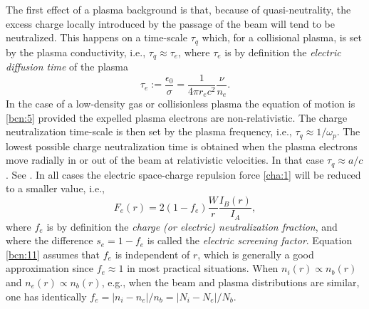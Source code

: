 \documentclass [12pt,a4paper,     ]{report} %
\newcommand{\DEF}{:=}                 %
\begin{document}
	The first effect of a plasma background is that, because of quasi-neutrality, the excess charge locally introduced by the passage of the beam will tend to be neutralized.  This happens on a time-scale $\tau_q$ which, for a collisional plasma, is set by the plasma conductivity, i.e., $\tau_q \approx \tau_e$, where $\tau_e$ is by definition the \emph{electric diffusion time} of the plasma
%
\begin{equation}\label{bcn:10} %
            \tau_e \DEF \frac{\epsilon_0}{\sigma}
                      = \frac{1}{4\pi r_e c^2}\frac{\nu}{n_e}.
\end{equation}
%
In the case of a low-density gas or collisionless plasma the equation of motion is \eqref{bcn:5} provided the expelled plasma electrons are non-relativistic.  The charge neutralization time-scale is then set by the plasma frequency, i.e., $\tau_q \approx 1/\omega_p$.  The lowest possible charge neutralization time is obtained when the plasma electrons move radially in or out of the beam at relativistic velocities.  In that case $\tau_q \approx a/c$. See \cite[p.531]{OLSON1973-}.  In all cases the electric space-charge repulsion force \eqref{cha:1} will be reduced to a smaller value, i.e.,
%
\begin{equation}\label{bcn:11} %
     F_e(r) = 2 (1-f_e)\frac{W}{r} \frac{I_B(r)}{I_A},
\end{equation}
%
where $f_e$ is by definition the \emph{charge (or electric) neutralization fraction}, and where the difference $s_e = 1-f_e$ is called the \emph{electric screening factor}.  Equation \eqref{bcn:11} assumes that $f_e$ is independent of $r$, which is generally a good approximation since $f_e \approx 1$ in most practical situations.  When $n_i(r) \propto n_b(r)$ and $n_e(r) \propto n_b(r)$, e.g., when the beam and plasma distributions are similar, one has identically $f_e = |n_i-n_e|/n_b  = |N_i-N_e|/N_b$.
\end{document}
